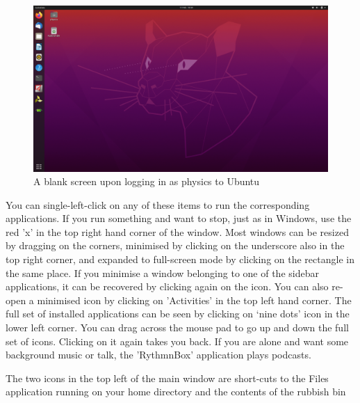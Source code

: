 \documentclass[../physical_computing.tex]{subfiles}
\begin{document}
\begin{figure}
    \centering
    \includegraphics[width=\textwidth]{chapter_1/figures/blank_ubuntu_screen.png}
    \caption{A blank screen upon logging in as physics to Ubuntu}
    \label{fig:emptyscreen}
\end{figure}

You can single-left-click on any of these items to run the corresponding applications. If you run something and want to stop, just as in Windows, use the red 'x' in the top right hand corner of the window. Most windows can be resized by dragging on the corners, minimised by clicking on the underscore also in the top right corner, and expanded to full-screen mode by clicking on the rectangle in the same place. If you minimise a window belonging to one of the sidebar applications, it can be recovered by clicking again on the icon. You can also re-open a minimised icon by clicking on 'Activities' in the top left hand corner. The full set of installed applications can be seen by clicking on `nine dots' icon in the lower left corner. You can drag across the mouse pad to go up and down the full set of icons. Clicking on it again takes you back. If you are alone and want some background music or talk, the 'RythmnBox' application plays podcasts. 

The two icons in the top left of the main window are short-cuts to the Files application running on your home directory and the contents of the rubbish bin
\end{document}
